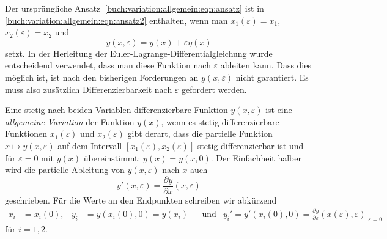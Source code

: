 Der ursprüngliche Ansatz~\eqref{buch:variation:allgemein:eqn:ansatz}
ist in \eqref{buch:variation:allgemein:eqn:ansatz2} enthalten, wenn
man $x_1(\varepsilon)=x_1$, $x_2(\varepsilon)=x_2$ und
\[
y(x,\varepsilon) = y(x) + \varepsilon \eta(x)
\]
setzt.
In der Herleitung der Euler-Lagrange-Differentialgleichung wurde
entscheidend verwendet, dass man diese Funktion nach $\varepsilon$
ableiten kann.
Dass dies möglich ist, ist nach den bisherigen Forderungen an
$y(x,\varepsilon)$ nicht garantiert.
Es muss also zusätzlich Differenzierbarkeit nach $\varepsilon$
gefordert werden.

\begin{definition}
\label{buch:variation:allgemein:def:variation}
Eine stetig nach beiden Variablen differenzierbare Funktion $y(x,\varepsilon)$
ist eine {\em allgemeine Variation} der Funktion $y(x)$, wenn es stetig
differenzierbare Funktionen
$x_1(\varepsilon)$ und $x_2(\varepsilon)$ gibt derart, dass
die partielle Funktion $x\mapsto y(x,\varepsilon)$ auf dem
Intervall $[x_1(\varepsilon),x_2(\varepsilon)]$ stetig differenzierbar
ist und für $\varepsilon=0$ mit $y(x)$ übereinstimmt: $y(x)=y(x,0)$.
Der Einfachheit halber wird die partielle Ableitung von $y(x,\varepsilon)$
nach $x$ auch
\[
y'(x,\varepsilon) = \frac{\partial y}{\partial x}(x,\varepsilon)
\]
geschrieben.
Für die Werte an den Endpunkten schreiben wir abkürzend
\begin{align*}
x_i &= x_i(0),
&
y_i &= y(x_i(0),0) = y(x_i)
&&\text{und}&
y_i'
=
y'(x_i(0),0)
=
\frac{\partial y}{\partial\varepsilon} (x(\varepsilon),\varepsilon)
\bigg|_{\varepsilon=0}
\end{align*}
für $i=1,2$.
\end{definition}

%
%
